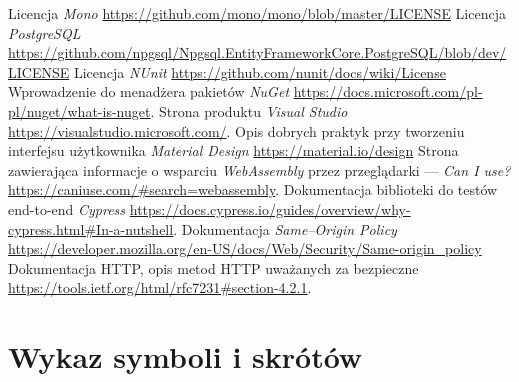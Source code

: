 \documentclass[a4paper,11pt,twoside]{report}
\theoremstyle{definition}
\begin{document}
\begin{thebibliography}{25}
     Licencja \emph{Mono} \url{https://github.com/mono/mono/blob/master/LICENSE}
     Licencja \emph{PostgreSQL} \url{https://github.com/npgsql/Npgsql.EntityFrameworkCore.PostgreSQL/blob/dev/LICENSE}
     Licencja \emph{NUnit} \url{https://github.com/nunit/docs/wiki/License}
     Wprowadzenie do menadżera pakietów \emph{NuGet} \url{https://docs.microsoft.com/pl-pl/nuget/what-is-nuget}.
     Strona produktu \emph{Visual Studio} \url{https://visualstudio.microsoft.com/}.
     Opis dobrych praktyk przy tworzeniu interfejsu użytkownika \emph{Material Design} \url{https://material.io/design}
     Strona zawierająca informacje o wsparciu \textit{WebAssembly} przez przeglądarki --- \emph{Can I use?} \url{https://caniuse.com/#search=webassembly}.
     Dokumentacja biblioteki do testów end-to-end \emph{Cypress} \url{https://docs.cypress.io/guides/overview/why-cypress.html#In-a-nutshell}.
     Dokumentacja \emph{Same--Origin Policy} \url{https://developer.mozilla.org/en-US/docs/Web/Security/Same-origin_policy}
     Dokumentacja HTTP, opis metod HTTP uważanych za bezpieczne \url{https://tools.ietf.org/html/rfc7231#section-4.2.1}.
\end{thebibliography}

\thispagestyle{empty}



\chapter*{Wykaz symboli i skrótów}
\end{document}
